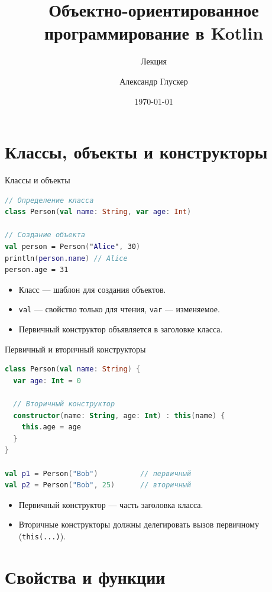 \documentclass[aspectratio=169]{beamer}
\title{Объектно-ориентированное программирование в Kotlin}
\subtitle{Лекция}
\author{Александр Глускер}
\institute{Курс «Мобильная разработка»}
\date{\today}
\begin{document}
\frame{\titlepage}


\section{Классы, объекты и конструкторы}

\begin{frame}[fragile]{Классы и объекты}
  \begin{lstlisting}[language=Kotlin]
// Определение класса
class Person(val name: String, var age: Int)

// Создание объекта
val person = Person("Alice", 30)
println(person.name) // Alice
person.age = 31
  \end{lstlisting}
  \begin{itemize}
    \item Класс — шаблон для создания объектов.
    \item \texttt{val} — свойство только для чтения, \texttt{var} — изменяемое.
    \item Первичный конструктор объявляется в заголовке класса.
  \end{itemize}
\end{frame}

\begin{frame}[fragile]{Первичный и вторичный конструкторы}
  \begin{lstlisting}[language=Kotlin]
class Person(val name: String) {
  var age: Int = 0

  // Вторичный конструктор
  constructor(name: String, age: Int) : this(name) {
    this.age = age
  }
}

val p1 = Person("Bob")          // первичный
val p2 = Person("Bob", 25)      // вторичный
  \end{lstlisting}
  \begin{itemize}
    \item Первичный конструктор — часть заголовка класса.
    \item Вторичные конструкторы должны делегировать вызов первичному (\texttt{this(...)}).
  \end{itemize}
\end{frame}

\section{Свойства и функции}
\end{document}
